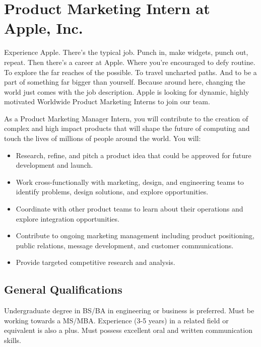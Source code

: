 \documentclass[a4paper,11pt]{article}
\begin{document}
\section*{Product Marketing Intern at Apple, Inc.}

Experience Apple.
There’s the typical job. Punch in, make widgets, punch out, repeat. Then there’s a career at Apple.
Where you’re encouraged to defy routine. To explore the far reaches of the possible. To travel uncharted paths.
And to be a part of something far bigger than yourself. Because around here, changing the world just comes with the job description.
Apple is looking for dynamic, highly motivated Worldwide Product Marketing Interns to join our team.

As a Product Marketing Manager Intern, you will contribute to the creation of complex and high impact products that will shape the future of computing and touch the lives of millions of people around the world. You will:
\begin{itemize}
 \item Research, refine, and pitch a product idea that could be approved for future development and launch.
 \item Work cross-functionally with marketing, design, and engineering teams to identify problems, design solutions, and explore opportunities.
 \item Coordinate with other product teams to learn about their operations and explore integration opportunities.
 \item Contribute to ongoing marketing management including product positioning, public relations, message development, and customer communications.
 \item Provide targeted competitive research and analysis.
\end{itemize}

\subsection*{General Qualifications}

Undergraduate degree in BS/BA in engineering or business is preferred. Must be working towards a MS/MBA.
Experience (3-5 years) in a related field or equivalent is also a plus. Must possess excellent oral and written communication skills.
\end{document}
